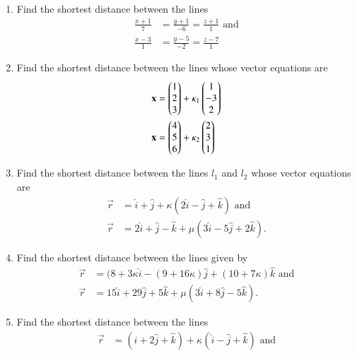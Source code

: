 \begin{enumerate}[label=\thesubsection.\arabic*,ref=\thesubsection.\theenumi]
\item Find the shortest distance between the lines
\begin{align}
	\frac{x+1}{7}&=\frac{y+1}{-6}=\frac{z+1}{1} \text{ and}
	\\
	\frac{x-3}{1}&=\frac{y-5}{-2}=\frac{z-7}{1}
\end{align}
    \solution
		
    \item Find the shortest distance between the lines whose vector equations are
    \begin{align}
\begin{split}
	\mathbf{x} &= \begin{pmatrix}1\\2\\3\end{pmatrix} + \kappa_1\begin{pmatrix}1\\-3\\2\end{pmatrix}
	\\
	\mathbf{x} &= \begin{pmatrix}4\\5\\6\end{pmatrix} + \kappa_2\begin{pmatrix}2\\3\\1\end{pmatrix}
\end{split}
        \label{eq:chapters/12/11/2/16/L2/svd}
    \end{align}
    \solution
		
\item Find the shortest distance between the lines $l_1$ and $l_2$ whose vector equations are 
\begin{align}
	\overrightarrow{r} &= \hat{i}+\hat{j}+\kappa(2\hat{i}-\hat{j}+\hat{k}) \text{ and}
	\\
	\overrightarrow{r} &= 2\hat{i}+\hat{j}-\hat{k}+\mu(3\hat{i}-5\hat{j}+2\hat{k}).
\end{align}
    \solution
		
\item Find the shortest distance between the lines given by 
\begin{align}
	\overrightarrow{r}&=(8+3\kappa\hat{i}-(9+16\kappa)\hat{j}+(10+7\kappa)\hat{k} \text{ and} 
	\\
	\overrightarrow{r}&=15\hat{i}+29\hat{j}+5\hat{k}+\mu(3\hat{i}+8\hat{j}-5\hat{k}).
\end{align}
\item Find the shortest distance between the lines
\begin{align}
	\overrightarrow{r}&=(\hat{i}+2\hat{j}+\hat{k})+\kappa(\hat{i}-\hat{j}+\hat{k}) \text{ and} 

\end{align}
\end{enumerate}
